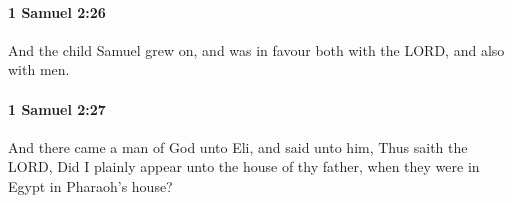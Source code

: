 		\paragraph{1 Samuel 2:26} %
			\label{1SAMUEL-2-26}

			And the child Samuel grew on, and was in favour both with the LORD, and also with men.


		\paragraph{1 Samuel 2:27} %
			\label{1SAMUEL-2-27}

			And there came a man of God unto Eli, and said unto him, Thus saith the LORD, Did I plainly appear unto the house of thy father, when they were in Egypt in Pharaoh’s house?


